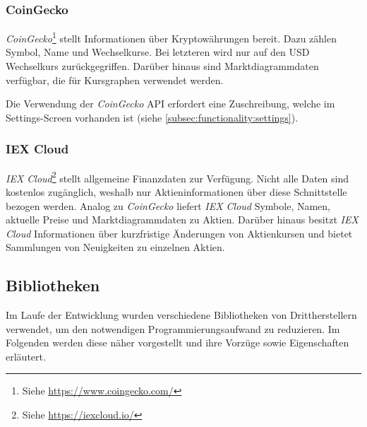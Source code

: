 \documentclass[a4paper]{article}
\begin{document}
\subsubsection{CoinGecko}
\label{subsubsec:technologies:apis:coingecko}
\textit{CoinGecko}\footnote{Siehe \url{https://www.coingecko.com/}} stellt Informationen über Kryptowährungen bereit.
Dazu zählen Symbol, Name und Wechselkurse.
Bei letzteren wird nur auf den USD Wechselkurs zurückgegriffen.
Darüber hinaus sind Marktdiagrammdaten verfügbar, die für Kursgraphen verwendet werden.

Die Verwendung der \textit{CoinGecko} API erfordert eine Zuschreibung, welche im Settings-Screen vorhanden ist (siehe \autoref{subsec:functionality:settings}).

\subsubsection{IEX Cloud}
\label{subsubsec:technologies:apis:iex}
\textit{IEX Cloud}\footnote{Siehe \url{https://iexcloud.io/}} stellt allgemeine Finanzdaten zur Verfügung.
Nicht alle Daten sind kostenlos zugänglich, weshalb nur Aktieninformationen über diese Schnittstelle bezogen werden.
Analog zu \textit{CoinGecko} liefert \textit{IEX Cloud} Symbole, Namen, aktuelle Preise und Marktdiagrammdaten zu Aktien.
Darüber hinaus besitzt \textit{IEX Cloud} Informationen über kurzfristige Änderungen von Aktienkursen und bietet Sammlungen von Neuigkeiten zu einzelnen Aktien.


\subsection{Bibliotheken}
\label{subsec:technologies:bibs}
Im Laufe der Entwicklung wurden verschiedene Bibliotheken von Drittherstellern verwendet, um den notwendigen Programmierungsaufwand zu reduzieren.
Im Folgenden werden diese näher vorgestellt und ihre Vorzüge sowie Eigenschaften erläutert.
\end{document}
